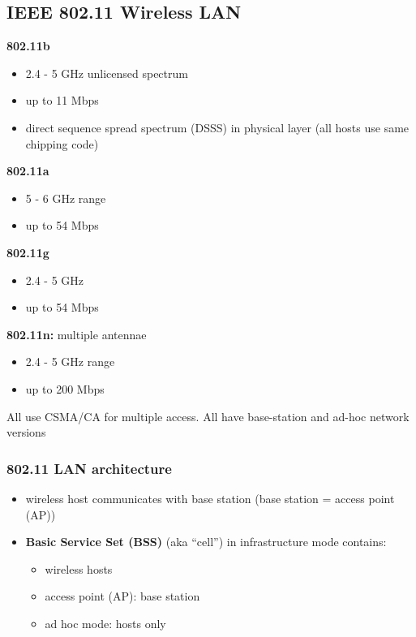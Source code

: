 \subsection{IEEE 802.11 Wireless LAN}
\textbf{802.11b}
\begin{itemize}
	\item 2.4 - 5 GHz unlicensed spectrum
	\item up to 11 Mbps
	\item direct sequence spread spectrum (DSSS) in physical layer (all hosts use same chipping code)
\end{itemize}
\textbf{802.11a}
\begin{itemize}
	\item 5 - 6 GHz range
	\item up to 54 Mbps
\end{itemize}
\textbf{802.11g}
\begin{itemize}
	\item 2.4 - 5 GHz
	\item up to 54 Mbps
\end{itemize}
\textbf{802.11n:} multiple antennae
\begin{itemize}
	\item 2.4 - 5 GHz range
	\item up to 200 Mbps
\end{itemize}
All use CSMA/CA for multiple access. All have base-station and ad-hoc network versions
\subsubsection{802.11 LAN architecture}
\begin{itemize}
	\item wireless host communicates with base station (base station = access point (AP))
	\item \textbf{Basic Service Set (BSS)} (aka ``cell'') in infrastructure mode contains:
	\begin{itemize}
		\item wireless hosts
		\item access point (AP): base station
		\item ad hoc mode: hosts only
	\end{itemize}
\end{itemize}
